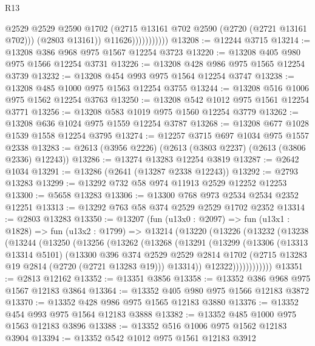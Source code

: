 \begin{lexlean}{R13}
\begin{coremodule}
                            @2529
                            @2529
                            @2590
                            @1702
                            (@2715 @13161 @702 @2590 (@2720 (@2721 @13161 @702)))
                            (@2803 @13161))
                          @11626)))))))))))
@13208 := @12244 @3715
@13214 := @13208 @386 @968 @975 @1567 @12254 @3723
@13220 := @13208 @405 @980 @975 @1566 @12254 @3731
@13226 := @13208 @428 @986 @975 @1565 @12254 @3739
@13232 := @13208 @454 @993 @975 @1564 @12254 @3747
@13238 := @13208 @485 @1000 @975 @1563 @12254 @3755
@13244 := @13208 @516 @1006 @975 @1562 @12254 @3763
@13250 := @13208 @542 @1012 @975 @1561 @12254 @3771
@13256 := @13208 @583 @1019 @975 @1560 @12254 @3779
@13262 := @13208 @636 @1024 @975 @1559 @12254 @3787
@13268 := @13208 @677 @1028 @1539 @1558 @12254 @3795
@13274 := @12257 @3715 @697 @1034 @975 @1557 @2338
@13283 := @2613 (@3956 @2226) (@2613 (@3803 @2237) (@2613 (@3806 @2336) @12243))
@13286 := @13274 @13283 @12254 @3819
@13287 := @2642 @1034
@13291 := @13286 (@2641 (@13287 @2338 @12243))
@13292 := @2793 @13283
@13299 := @13292 @732 @58 @974 @11913 @2529 @12252 @12253
@13300 := @5658 @13283
@13306 := @13300 @768 @973 @2534 @2534 @2352 @12251
@13313 := @13292 @763 @58 @374 @2529 @2529 @1702 @2352
@13314 := @2803 @13283
@13350 := @13207
    (fun (u13x0 : @2097) =>
    fun (u13x1 : @1828) =>
    fun (u13x2 : @1799) =>
    @13214
      (@13220
        (@13226
          (@13232
            (@13238
              (@13244
                (@13250
                  (@13256
                    (@13262
                      (@13268
                        (@13291
                          (@13299
                            (@13306
                              (@13313 @13314 @5101)
                              (@13300
                                @396
                                @374
                                @2529
                                @2529
                                @2814
                                @1702
                                (@2715 @13283 @19 @2814 (@2720 (@2721 @13283 @19)))
                                @13314))
                            @12322))))))))))))
@13351 := @2813 @12162
@13352 := @13351 @3856
@13358 := @13352 @386 @968 @975 @1567 @12183 @3864
@13364 := @13352 @405 @980 @975 @1566 @12183 @3872
@13370 := @13352 @428 @986 @975 @1565 @12183 @3880
@13376 := @13352 @454 @993 @975 @1564 @12183 @3888
@13382 := @13352 @485 @1000 @975 @1563 @12183 @3896
@13388 := @13352 @516 @1006 @975 @1562 @12183 @3904
@13394 := @13352 @542 @1012 @975 @1561 @12183 @3912

\end{coremodule}
\end{lexlean}
